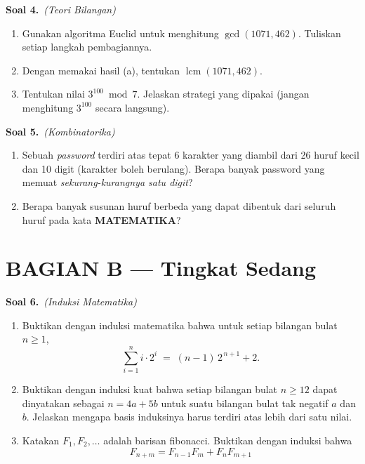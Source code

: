 \documentclass[11pt,a4paper]{article}
\newcommand{\soal}[2]{%
  \vspace{4pt}\noindent\textbf{Soal #1.}\ \textit{(#2)}\par\nobreak\vspace{2pt}}
\DeclareMathOperator{\lcmop}{lcm}
\begin{document}
\soal{4}{Teori Bilangan}
\begin{enumerate}[label=(\alph*),leftmargin=*]
  \item Gunakan algoritma Euclid untuk menghitung $\gcd(1071, 462)$.
        Tuliskan setiap langkah pembagiannya.
  \item Dengan memakai hasil (a), tentukan $\lcmop(1071, 462)$.
  \item Tentukan nilai $3^{100} \bmod 7$. Jelaskan strategi yang dipakai
        (jangan menghitung $3^{100}$ secara langsung).
\end{enumerate}

\soal{5}{Kombinatorika}
\begin{enumerate}[label=(\alph*),leftmargin=*]
  \item Sebuah \emph{password} terdiri atas tepat 6 karakter yang diambil dari
        26 huruf kecil dan 10 digit (karakter boleh berulang).
        Berapa banyak password yang memuat \emph{sekurang-kurangnya satu digit}?
  \item Berapa banyak susunan huruf berbeda yang dapat dibentuk dari
        seluruh huruf pada kata \textbf{MATEMATIKA}?
\end{enumerate}

\section*{BAGIAN B --- Tingkat Sedang}

\soal{6}{Induksi Matematika}
\begin{enumerate}[label=(\alph*),leftmargin=*]
  \item Buktikan dengan induksi matematika bahwa untuk setiap bilangan bulat $n \ge 1$,
  \[
  \sum_{i=1}^{n} i \cdot 2^{i} \;=\; (n-1)\,2^{\,n+1} + 2 .
  \]
  \item Buktikan dengan induksi kuat bahwa setiap bilangan bulat $n \ge 12$ dapat
  dinyatakan sebagai $n = 4a + 5b$ untuk suatu bilangan bulat tak negatif $a$ dan $b$.
  Jelaskan mengapa basis induksinya harus terdiri atas lebih dari satu nilai.
  \item Katakan $F_1,F_2,\dots$ adalah barisan fibonacci. Buktikan dengan induksi bahwa
  \[
  F_{n+m} = F_{n-1}F_m + F_nF_{m+1}
  \]
\end{enumerate}
\end{document}
